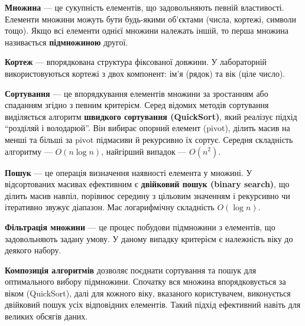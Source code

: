 \documentclass[12pt,a4paper]{article}
\begin{document}
    \vspace{1em}

    \textbf{Множина} --- це сукупність елементів, що задовольняють певній властивості. Елементи множини можуть бути будь-якими об’єктами (числа, кортежі, символи тощо). Якщо всі елементи однієї множини належать іншій, то перша множина називається \textbf{підмножиною} другої.

    \vspace{1em}

    \textbf{Кортеж} --- впорядкована структура фіксованої довжини. У лабораторній використовуються кортежі з двох компонент: ім’я (рядок) та вік (ціле число).

    \vspace{1em}

    \textbf{Сортування} --- це впорядкування елементів множини за зростанням або спаданням згідно з певним критерієм. Серед відомих методів сортування виділяється алгоритм \textbf{швидкого сортування (QuickSort)}, який реалізує підхід ``розділяй і володарюй''. Він вибирає опорний елемент (pivot), ділить масив на менші та більші за pivot підмасиви й рекурсивно їх сортує. Середня складність алгоритму — $O(n \log n)$, найгірший випадок — $O(n^2)$.

    \vspace{1em}

    \textbf{Пошук} --- це операція визначення наявності елемента у множині. У відсортованих масивах ефективним є \textbf{двійковий пошук (binary search)}, що ділить масив навпіл, порівнює середину з цільовим значенням і рекурсивно чи ітеративно звужує діапазон. Має логарифмічну складність $O(\log n)$.

    \vspace{1em}

    \textbf{Фільтрація множини} --- це процес побудови підмножини з елементів, що задовольняють задану умову. У даному випадку критерієм є належність віку до деякого набору.

    \vspace{1em}

    \textbf{Композиція алгоритмів} дозволяє поєднати сортування та пошук для оптимального вибору підмножини. Спочатку вся множина впорядковується за віком (QuickSort), далі для кожного віку, вказаного користувачем, виконується двійковий пошук усіх відповідних елементів. Такий підхід ефективний навіть для великих обсягів даних.

    \vspace{2em}
\end{document}
